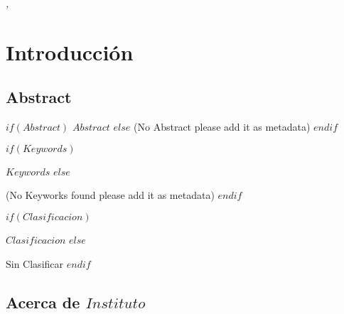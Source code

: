 \documentclass[11pt,fleqn]{book} %
\begin{document}
\noindent \textit{\MONTH, \the\year} %



\pagestyle{empty} %

\tableofcontents %

\cleardoublepage %

\pagestyle{fancy} %



\chapter{Introducción}

\section{Abstract}

$if(Abstract)$
\textit{$Abstract$}
$else$
(No Abstract please add it as metadata)
$endif$

\vspace{5mm} %


\begin{description}
$if(Keywords)$
\item[Keywords] $Keywords$
$else$
\item[Keywords] (No Keyworks found please add it as metadata)
$endif$

$if(Clasificacion)$
\item[Clasificación] $Clasificacion$
$else$
\item[Clasificación] Sin Clasificar 
$endif$

\end{description}


\section{Acerca de $Instituto$}
\end{document}
